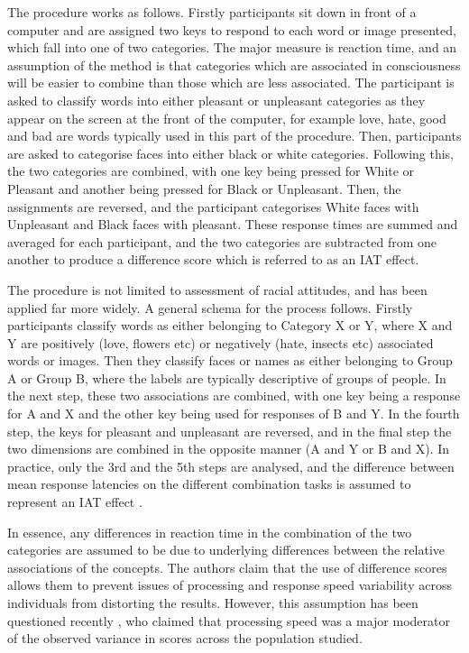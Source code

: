 The procedure works as follows. Firstly participants sit down in front of a computer and are assigned two keys to respond to each word or image presented, which fall into one of two categories. The major measure is reaction time, and an assumption of the method is that categories which are associated in consciousness will be easier to combine than those which are less associated.  The participant is asked to classify words into either pleasant or unpleasant categories as they appear on the screen at the front of the computer, for example love, hate, good  and bad are words typically used in this part of the procedure. Then, participants are asked to categorise faces into either black or white categories. Following this, the two categories are combined, with one key being pressed for White or Pleasant and another being pressed for Black or Unpleasant. Then, the assignments are reversed, and the participant categorises White faces with Unpleasant and Black faces with pleasant. These response times are summed and averaged for each participant, and the two categories are subtracted from one another to produce a difference score which is referred to as an IAT effect. 

The procedure is not limited to assessment of racial attitudes, and has been applied far more widely.  A general schema for the process follows.    Firstly participants classify words as either belonging to Category X or Y, where X and Y are positively (love, flowers etc) or negatively (hate, insects etc) associated words or images.  Then they classify faces or names as either belonging to Group A or Group B, where the labels are typically descriptive of groups of people.  In the next step, these two associations are combined, with one key being a response for A and X and the other key being used for responses of B and Y. In the fourth step, the keys for pleasant and unpleasant are reversed, and in the final step the two dimensions are combined in the opposite manner (A and Y or B and X). In practice, only the 3rd and the 5th steps are analysed, and the difference between mean response latencies on the different combination tasks is assumed to represent an IAT effect \cite{Greenwald1998} . 

In essence, any differences in reaction time in the combination of the two categories are assumed to be due to underlying differences between the relative associations of the concepts. The authors claim that the use of difference scores allows them to prevent issues of processing and response speed variability across individuals from distorting the results. However, this assumption has been questioned recently \cite{Blanton2006}, who claimed that processing speed was a major moderator of the observed variance in scores across the population studied.  

